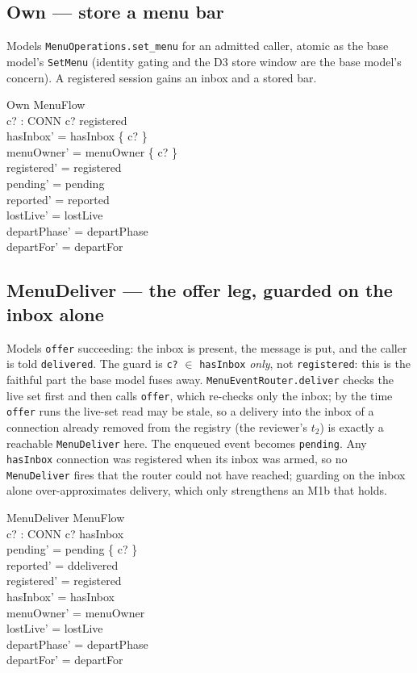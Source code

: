 \documentclass[a4paper,10pt,fleqn]{article}
\begin{document}
\subsection{Own --- store a menu bar}

Models \texttt{MenuOperations.set\_menu} for an admitted caller, atomic as the
base model's \texttt{SetMenu} (identity gating and the D3 store window are the
base model's concern). A registered session gains an inbox and a stored bar.

\begin{schema}{Own}
  \Delta MenuFlow \\
  c? : CONN
\where
  c? \in registered \\
  hasInbox' = hasInbox \cup \{ c? \} \\
  menuOwner' = menuOwner \cup \{ c? \} \\
  registered' = registered \\
  pending' = pending \\
  reported' = reported \\
  lostLive' = lostLive \\
  departPhase' = departPhase \\
  departFor' = departFor
\end{schema}

\subsection{MenuDeliver --- the offer leg, guarded on the inbox alone}
\label{sec:menudeliver}

Models \texttt{offer} succeeding: the inbox is present, the message is put, and
the caller is told \texttt{delivered}. The guard is \texttt{c?} $\in$
\texttt{hasInbox} \emph{only}, not \texttt{registered}: this is the faithful
part the base model fuses away. \texttt{MenuEventRouter.deliver} checks the
live set first and then calls \texttt{offer}, which re-checks only the inbox;
by the time \texttt{offer} runs the live-set read may be stale, so a delivery
into the inbox of a connection already removed from the registry (the reviewer's
$t_2$) is exactly a reachable \texttt{MenuDeliver} here. The enqueued event
becomes \texttt{pending}. Any \texttt{hasInbox} connection was registered when
its inbox was armed, so no \texttt{MenuDeliver} fires that the router could not
have reached; guarding on the inbox alone over-approximates delivery, which
only strengthens an M1b that holds.

\begin{schema}{MenuDeliver}
  \Delta MenuFlow \\
  c? : CONN
\where
  c? \in hasInbox \\
  pending' = pending \cup \{ c? \} \\
  reported' = ddelivered \\
  registered' = registered \\
  hasInbox' = hasInbox \\
  menuOwner' = menuOwner \\
  lostLive' = lostLive \\
  departPhase' = departPhase \\
  departFor' = departFor
\end{schema}
\end{document}
